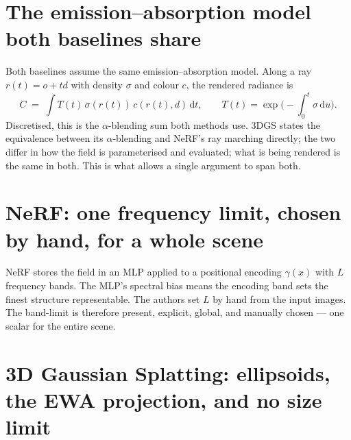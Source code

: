 \section{The emission--absorption model both baselines share}
Both baselines assume the same emission--absorption model. Along a ray
$r(t)=o+td$ with density $\sigma$ and colour $c$, the rendered radiance is
\begin{equation}
  C \;=\; \int T(t)\,\sigma(r(t))\,c(r(t),d)\,\mathrm{d}t,
  \qquad T(t)=\exp\!\Big(-\!\int_0^t\!\sigma\,\mathrm{d}u\Big).
\end{equation}
Discretised, this is the $\alpha$-blending sum both methods use. 3DGS states the
equivalence between its $\alpha$-blending and NeRF's ray marching directly; the two differ in how the field is parameterised and evaluated; what is being
rendered is the same in both. This is what allows a single argument to span both.

\section{NeRF: one frequency limit, chosen by hand, for a whole scene}
NeRF stores the field in an MLP applied to a positional encoding $\gamma(x)$ with
$L$ frequency bands. The MLP's spectral bias means the encoding band sets the
finest structure representable. The authors set $L$ by hand from the input
images. The band-limit is therefore present, explicit, global, and manually
chosen --- one scalar for the entire scene.

\section{3D Gaussian Splatting: ellipsoids, the EWA projection, and no size limit}

